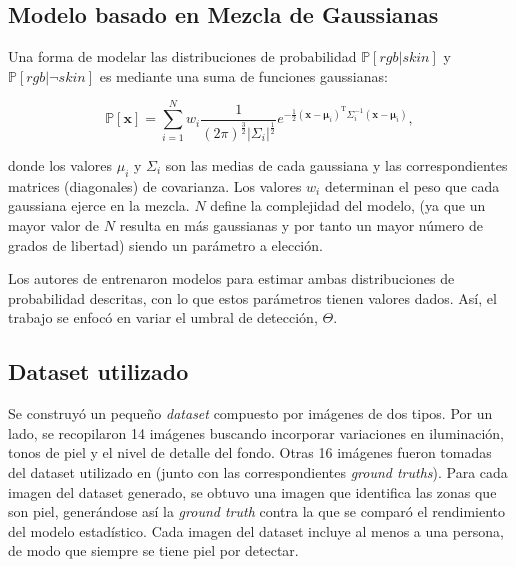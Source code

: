 \documentclass[12pt]{article}
\begin{document}
\subsection{Modelo basado en Mezcla de Gaussianas}

Una forma de modelar las distribuciones de probabilidad  $\mathbb{P} [ rgb|skin
]$ y $\mathbb{P} [ rgb | \neg skin ]$ es mediante una suma de funciones
gaussianas:

\begin{equation}
    \mathbb{P}[\mathbf{x}] = \sum\limits_{i=1}^N w_i
    \frac{1}{(2\pi)^{\frac{3}{2}} | \Sigma_i |^\frac{1}{2}} e^{-\frac{1}{2}
    (\mathbf{x} - \mathbf{\mu}_i)^{\text{T}} \Sigma_i ^{-1} (\mathbf{x} -
    \mathbf{\mu}_i)},
\end{equation} 

donde los valores $\mu_i$ y $\Sigma_i$ son las medias de cada gaussiana y las
correspondientes matrices (diagonales) de covarianza. Los valores $w_i$
determinan el peso que cada gaussiana ejerce en la mezcla. $N$ define la
complejidad del modelo, (ya que un mayor valor de $N$ resulta en más gaussianas
y por tanto un mayor número de grados de libertad) siendo un parámetro a
elección. 

Los autores de \cite{skin} entrenaron modelos para estimar ambas
distribuciones de probabilidad descritas, con lo que estos parámetros tienen
valores dados. Así, el trabajo se enfocó en variar el umbral de detección,
$\Theta$.

\subsection{Dataset utilizado}

Se construyó un pequeño \emph{dataset} compuesto por imágenes de dos tipos. Por
un lado, se recopilaron 14 imágenes buscando incorporar variaciones en
iluminación, tonos de piel y el nivel de detalle del fondo. Otras 16 imágenes
fueron tomadas del dataset utilizado en \cite{dataset} (junto con las
correspondientes \emph{ground truths}). Para cada imagen del
dataset generado, se obtuvo una imagen que identifica las zonas que son piel,
generándose así la \emph{ground truth} contra la que se comparó el rendimiento
del modelo estadístico. Cada imagen del dataset incluye al menos a una persona,
de modo que siempre se tiene piel por detectar.

\begin{comment}
\begin{figure}[H]
    \centering
    \subcaptionbox{Imagen del \emph{dataset}
    utilizado.}{\texttt{[image: ../images/nonbin/12.png]}}
    \subcaptionbox{Perfil de piel utilizado como \emph{ground
    truth}}{\texttt{[image: ../images/bin/12.png]}}
    \caption{Ejemplo del \emph{dataset} usado.}
\end{figure}
\end{comment}
\end{document}
